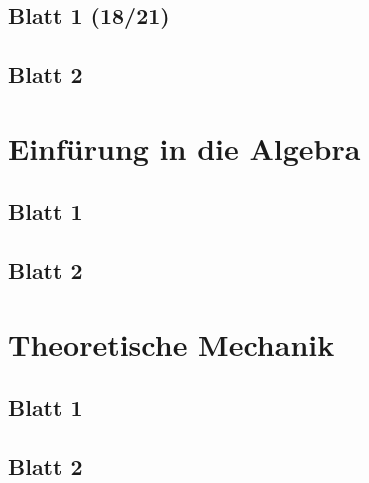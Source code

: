 \documentclass{tuftebook}
\numberwithin{Theorem}{chapter}
\theoremstyle{definition}
\theoremstyle{definition}
\begin{document}
\section{Blatt 1 (18/21)}

\section{Blatt 2}


\chapter{Einf\"{u}rung in die Algebra}
\section{Blatt 1}

\section{Blatt 2}


\chapter{Theoretische Mechanik}
\section{Blatt 1}

\section{Blatt 2}

\end{document}

